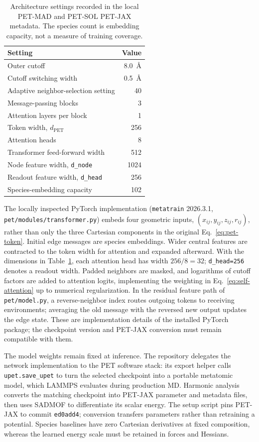 \documentclass[10pt,a4paper,twocolumn]{article}
\begin{document}
\begin{table}[htbp]
\centering
\small
\caption{Architecture settings recorded in the local PET-MAD and PET-SOL
PET-JAX metadata. The species count is embedding capacity, not a measure of
training coverage.}
\label{tab:pet-settings}
\begin{tabular}{lr}
\toprule
Setting & Value \\
\midrule
Outer cutoff & \SI{8.0}{\angstrom} \\
Cutoff switching width & \SI{0.5}{\angstrom} \\
Adaptive neighbor-selection setting & 40 \\
Message-passing blocks & 3 \\
Attention layers per block & 1 \\
Token width, $d_{\mathrm{PET}}$ & 256 \\
Attention heads & 8 \\
Transformer feed-forward width & 512 \\
Node feature width, \texttt{d\_node} & 1024 \\
Readout feature width, \texttt{d\_head} & 256 \\
Species-embedding capacity & 102 \\
\bottomrule
\end{tabular}
\end{table}

The locally inspected PyTorch implementation (\texttt{metatrain} 2026.3.1,
\texttt{pet/modules/transformer.py}) embeds four geometric inputs,
$(x_{ij},y_{ij},z_{ij},r_{ij})$, rather than only the three Cartesian
components in the original Eq.~\eqref{eq:pet-token}. Initial edge messages
are species embeddings. Wider central features are contracted to the token
width for attention and expanded afterward. With the dimensions in
Table~\ref{tab:pet-settings}, each attention head has width $256/8=32$;
\texttt{d\_head=256} denotes a readout width. Padded neighbors are masked,
and logarithms of cutoff factors are added to attention logits, implementing
the weighting in Eq.~\eqref{eq:self-attention} up to numerical regularization.
In the residual feature path of \texttt{pet/model.py}, a reverse-neighbor
index routes outgoing tokens to receiving environments; averaging the old
message with the reversed new output updates the edge state. These are
implementation details of the installed PyTorch package; the checkpoint
version and PET-JAX conversion must remain compatible with them.

The model weights remain fixed at inference. The repository delegates the
network implementation to the PET software stack: its export helper calls
\texttt{upet.save\_upet} to turn the selected checkpoint into a portable
metatomic model, which LAMMPS evaluates during production MD. Harmonic
analysis converts the matching checkpoint into PET-JAX parameter and metadata
files, then uses SADMOF to differentiate its scalar energy. The setup script
pins PET-JAX to commit \texttt{ed0add4}; conversion transfers parameters rather
than retraining a potential. Species baselines have zero Cartesian derivatives
at fixed composition, whereas the learned energy scale must be retained in
forces and Hessians.
\end{document}
